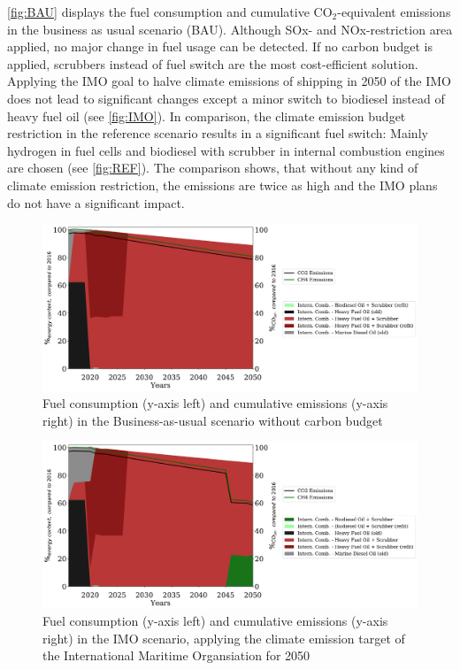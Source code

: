 \documentclass[article]{elsarticle}
\begin{document}
\autoref{fig:BAU} displays the fuel consumption and cumulative CO$_2$-equivalent emissions in the business as usual scenario (BAU). Although SOx- and NOx-restriction area applied, no major change in fuel usage can be detected. If no carbon budget is applied, scrubbers instead of fuel switch are the most cost-efficient solution. Applying the IMO goal to halve climate emissions of shipping in 2050 of the IMO does not lead to significant changes except a minor switch to biodiesel instead of heavy fuel oil (see \autoref{fig:IMO}). In comparison, the climate emission budget restriction in the reference scenario  results in a significant fuel switch: Mainly hydrogen in fuel cells and biodiesel with scrubber in internal combustion engines are chosen (see \autoref{fig:REF}). The comparison shows, that without any kind of climate emission restriction, the emissions are twice as high and the IMO plans do not have a significant impact. 

\begin{figure}
    \centering
    \includegraphics[width=\textwidth]{figures/BAU_fuels_emissions.pdf}
    \caption{Fuel consumption (y-axis left) and cumulative emissions (y-axis right) in the Business-as-usual scenario without carbon budget}
    \label{fig:BAU}
\end{figure}

\begin{figure}
    \centering
    \includegraphics[width=\textwidth]{figures/IMO_fuels_emissions.pdf}
    \caption{Fuel consumption (y-axis left) and cumulative emissions (y-axis right) in the IMO scenario, applying the climate emission target of the International Maritime Organsiation for 2050}
    \label{fig:IMO}
\end{figure}
\end{document}
